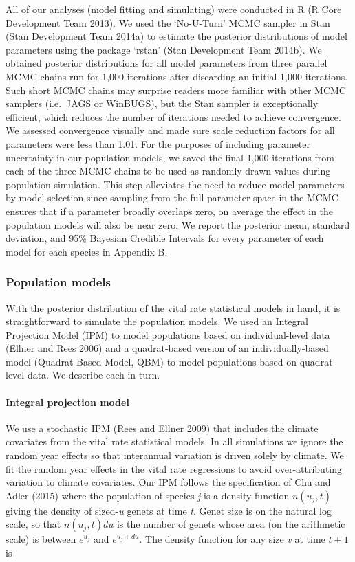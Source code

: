 \documentclass[12pt,]{article}
\begin{document}
All of our analyses (model fitting and simulating) were conducted in R
(R Core Development Team 2013). We used the `No-U-Turn' MCMC sampler in
Stan (Stan Development Team 2014a) to estimate the posterior
distributions of model parameters using the package `rstan' (Stan
Development Team 2014b). We obtained posterior distributions for all
model parameters from three parallel MCMC chains run for 1,000
iterations after discarding an initial 1,000 iterations. Such short MCMC
chains may surprise readers more familiar with other MCMC samplers
(i.e.~JAGS or WinBUGS), but the Stan sampler is exceptionally efficient,
which reduces the number of iterations needed to achieve convergence. We
assessed convergence visually and made sure scale reduction factors for
all parameters were less than 1.01. For the purposes of including
parameter uncertainty in our population models, we saved the final 1,000
iterations from each of the three MCMC chains to be used as randomly
drawn values during population simulation. This step alleviates the need
to reduce model parameters by model selection since sampling from the
full parameter space in the MCMC ensures that if a parameter broadly
overlaps zero, on average the effect in the population models will also
be near zero. We report the posterior mean, standard deviation, and 95\%
Bayesian Credible Intervals for every parameter of each model for each
species in Appendix B.

\subsubsection{Population models}\label{population-models}

With the posterior distribution of the vital rate statistical models in
hand, it is straightforward to simulate the population models. We used
an Integral Projection Model (IPM) to model populations based on
individual-level data (Ellner and Rees 2006) and a quadrat-based version
of an individually-based model (Quadrat-Based Model, QBM) to model
populations based on quadrat-level data. We describe each in turn.

\paragraph{Integral projection model}\label{integral-projection-model}

We use a stochastic IPM (Rees and Ellner 2009) that includes the climate
covariates from the vital rate statistical models. In all simulations we
ignore the random year effects so that interannual variation is driven
solely by climate. We fit the random year effects in the vital rate
regressions to avoid over-attributing variation to climate covariates.
Our IPM follows the specification of Chu and Adler (2015) where the
population of species \emph{j} is a density function \(n(u_{j},t)\)
giving the density of sized-\emph{u} genets at time \emph{t}. Genet size
is on the natural log scale, so that \(n(u_{j},t)du\) is the number of
genets whose area (on the arithmetic scale) is between \(e^{u_{j}}\) and
\(e^{u_{j}+du}\). The density function for any size \emph{v} at time
\(t+1\) is
\end{document}
